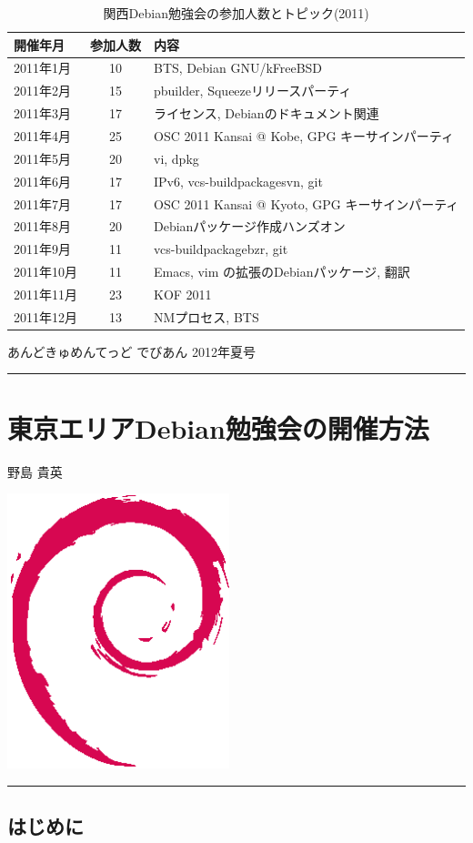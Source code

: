 \documentclass[mingoth,a4paper]{jsarticle}
\renewcommand{\dancersection}[2]{%
\newpage
あんどきゅめんてっど でびあん 2012年夏号
%
\vspace{0.1mm}\\
{\color{dancerdarkblue}\rule{\hsize}{2mm}}

%
%
\begin{minipage}[t]{0.6\hsize}
\color{dancerdarkblue}
\vspace{1cm}
\section{#1}
\hfill{}#2\\
\end{minipage}
\begin{minipage}[t]{0.4\hsize}
\vspace{-2cm}
\hfill{}\includegraphics[height=8cm]{image200502/openlogo-nd.eps}\\
\vspace{-5cm}
\end{minipage}
%
{\color{dancerlightblue}\rule{0.66\hsize}{2mm}}
%
\vspace{2cm}
}
\begin{document}
\begin{table}
\begin{minipage}{0.5\hsize}
  \end{minipage}
  \begin{minipage}{.45\linewidth}
    \caption{関西Debian勉強会の参加人数とトピック(2011)}\label{tab:count2011kansai}
    \begin{center}
      \begin{tabular}{|l|c|p{10em}|}
        \hline
        開催年月  & 参加人数 & 内容 \\
        \hline
        2011年1月 &10        & BTS, Debian GNU/kFreeBSD\\
        2011年2月 &15        & pbuilder, Squeezeリリースパーティ\\
        2011年3月 &17        & ライセンス, Debianのドキュメント関連\\
        2011年4月 &25        & OSC 2011 Kansai @ Kobe, GPG キーサインパーティ \\
        2011年5月 &20        & vi, dpkg \\
        2011年6月 &17        & IPv6, vcs-buildpackage{svn, git}\\
        2011年7月 &17        & OSC 2011 Kansai @ Kyoto, GPG キーサインパーティ\\
        2011年8月 &20        & Debianパッケージ作成ハンズオン\\
        2011年9月 &11        & vcs-buildpackage{bzr, git}\\
        2011年10月&11        & Emacs, vim の拡張のDebianパッケージ, 翻訳\\
        2011年11月&23        & KOF 2011\\
        2011年12月&13        & NMプロセス, BTS\\
        \hline
      \end{tabular}
    \end{center}
  \end{minipage}
\end{table}


\clearpage

\dancersection{東京エリアDebian勉強会の開催方法}{野島 貴英}

\subsection{はじめに}
\end{document}
